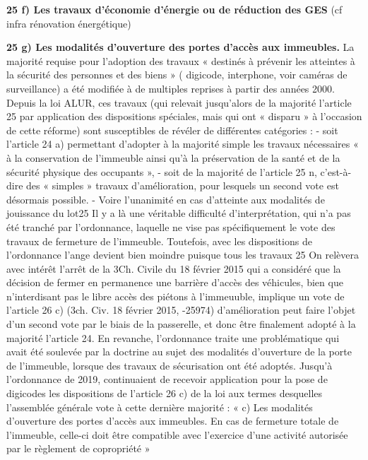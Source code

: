 				\begin{list}{}{}
					\item \textbf{25 f) Les travaux d’économie d’énergie ou de réduction des GES}
				(cf infra rénovation énergétique)
				
					\item \textbf{25 g) Les modalités d'ouverture des portes d'accès aux immeubles.}
					La majorité requise pour l’adoption des travaux « destinés à prévenir les atteintes à la sécurité des personnes et des biens » ( digicode, interphone, voir caméras de surveillance) a été modifiée à de multiples reprises à partir des années 2000.
					Depuis la loi ALUR, ces travaux (qui relevait jusqu’alors de la majorité l’article 25 par application des dispositions spéciales, mais qui ont « disparu » à l’occasion de cette réforme) sont susceptibles de révéler de différentes catégories :
					- soit l’article 24 a) permettant d’adopter à la majorité simple les travaux nécessaires « à la conservation de l'immeuble ainsi qu'à la préservation de la santé et de la sécurité physique des occupants »,
					- soit de la majorité de l’article 25 n, c’est-à-dire des « simples » travaux d’amélioration, pour lesquels un second vote est désormais possible.
					- Voire l’unanimité en cas d’atteinte aux modalités de jouissance du lot25
					Il y a là une véritable difficulté d’interprétation, qui n’a pas été tranché par l’ordonnance, laquelle ne vise pas spécifiquement le vote des travaux de fermeture de l’immeuble. Toutefois, avec les dispositions de l’ordonnance l’ange devient bien moindre puisque tous les travaux
					25 On relèvera avec intérêt l’arrêt de la 3\degres Ch. Civile du 18 février 2015 qui a considéré que la décision de fermer en permanence une barrière d’accès des véhicules, bien que n’interdisant pas le libre accès des piétons à l’immeuuble, implique un vote de l’article 26 c) (3\degres ch. Civ. 18 février 2015, -25974)
					d’amélioration peut faire l’objet d’un second vote par le biais de la passerelle, et donc être finalement adopté à la majorité l’article 24.
					En revanche, l’ordonnance traite une problématique qui avait été soulevée par la doctrine au sujet des modalités d’ouverture de la porte de l’immeuble, lorsque des travaux de sécurisation ont été adoptés. Jusqu’à l’ordonnance de 2019, continuaient de recevoir application pour la pose de digicodes les dispositions de l’article 26 c) de la loi aux termes desquelles l’assemblée générale vote à cette dernière majorité :
					« c) Les modalités d’ouverture des portes d’accès aux immeubles. En cas de fermeture totale de l’immeuble, celle-ci doit être compatible avec l’exercice d’une activité autorisée par le règlement de copropriété »

\end{list}
